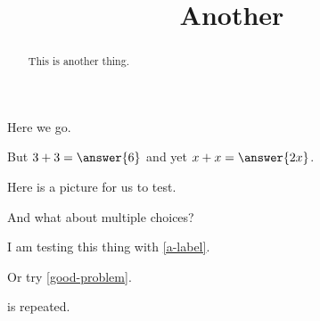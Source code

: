 \documentclass{ximera}
\title{Another}
\begin{document}
\begin{abstract}
  This is another thing.
\end{abstract}
\maketitle

Here we go.

\begin{problem}
  But $3 + 3 = \answer{6}$ and yet $x + x = \answer{2x}$.
\end{problem}

Here is a picture for us to test.


And what about multiple choices?
\begin{problem}
\begin{multipleChoice}
\end{multipleChoice}
\end{problem}

I am testing this thing with \ref{a-label}.

Or try \ref{good-problem}.

\begin{theorem}
  \label{thm:another}
\end{theorem}

\begin{corollary}
  \label{thm:whee} is repeated.
\end{corollary}
\end{document}
